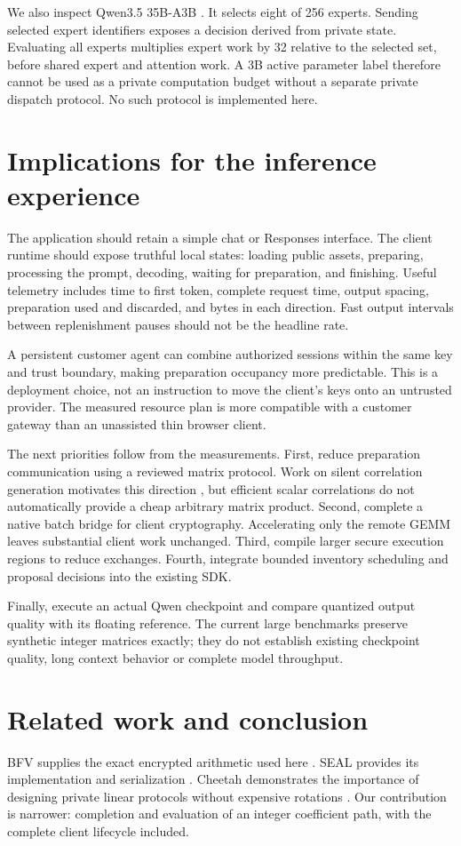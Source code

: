\documentclass[10pt,twocolumn]{article}
\begin{document}
We also inspect Qwen3.5 35B-A3B \cite{moeconfig}. It selects eight of 256 experts.
Sending selected expert identifiers exposes a decision derived from private
state. Evaluating all experts multiplies expert work by 32 relative to the
selected set, before shared expert and attention work. A 3B active parameter
label therefore cannot be used as a private computation budget without a
separate private dispatch protocol. No such protocol is implemented here.

\section{Implications for the inference experience}
The application should retain a simple chat or Responses interface. The client
runtime should expose truthful local states: loading public assets, preparing,
processing the prompt, decoding, waiting for preparation, and finishing.
Useful telemetry includes time to first token, complete request time, output
spacing, preparation used and discarded, and bytes in each direction. Fast
output intervals between replenishment pauses should not be the headline rate.

A persistent customer agent can combine authorized sessions within the same
key and trust boundary, making preparation occupancy more predictable. This
is a deployment choice, not an instruction to move the client's keys onto an
untrusted provider. The measured resource plan is more compatible with a
customer gateway than an unassisted thin browser client.

The next priorities follow from the measurements. First, reduce preparation
communication using a reviewed matrix protocol. Work on silent correlation
generation motivates this direction \cite{silent}, but efficient scalar
correlations do not automatically provide a cheap arbitrary matrix product.
Second, complete a native batch bridge for client cryptography. Accelerating
only the remote GEMM leaves substantial client work unchanged. Third, compile
larger secure execution regions to reduce exchanges. Fourth, integrate bounded
inventory scheduling and proposal decisions into the existing SDK.

Finally, execute an actual Qwen checkpoint and compare quantized output quality
with its floating reference. The current large benchmarks preserve synthetic
integer matrices exactly; they do not establish existing checkpoint quality,
long context behavior or complete model throughput.

\section{Related work and conclusion}
BFV supplies the exact encrypted arithmetic used here \cite{bfv}. SEAL provides
its implementation and serialization \cite{seal}. Cheetah demonstrates the
importance of designing private linear protocols without expensive rotations
\cite{cheetah}. Our contribution is narrower: completion and evaluation of an
integer coefficient path, with the complete client lifecycle included.
\end{document}

